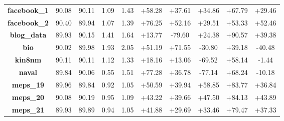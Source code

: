 \documentclass{article}
\begin{document}
\begin{table}[tbp]
{\begin{tabular}{cccccccccc}
    \textbf{facebook\_1} & 90.08  & 90.11  & 1.09  & 1.43  & \textcolor[rgb]{ 0,  .502,  0}{+58.28} & \textcolor[rgb]{ 0,  .502,  0}{+37.61} & \textcolor[rgb]{ 0,  .502,  0}{+34.86} & \textcolor[rgb]{ 0,  .502,  0}{+67.79} & \textcolor[rgb]{ 0,  .502,  0}{+29.46} \\
    \textbf{facebook\_2} & 90.40  & 89.94  & 1.07  & 1.39  & \textcolor[rgb]{ 0,  .502,  0}{+76.25} & \textcolor[rgb]{ 0,  .502,  0}{+52.16} & \textcolor[rgb]{ 0,  .502,  0}{+29.51} & \textcolor[rgb]{ 0,  .502,  0}{+53.33} & \textcolor[rgb]{ 0,  .502,  0}{+52.46} \\
    \textbf{blog\_data} & 89.93  & 90.15  & 1.41  & 1.64  & \textcolor[rgb]{ 0,  .502,  0}{+13.77} & \textcolor[rgb]{ 1,  0,  0}{-79.60} & \textcolor[rgb]{ 0,  .502,  0}{+24.38} & \textcolor[rgb]{ 0,  .502,  0}{+90.57} & \textcolor[rgb]{ 0,  .502,  0}{+39.38} \\
    \textbf{bio} & 90.02  & 89.98  & 1.93  & 2.05  & \textcolor[rgb]{ 0,  .502,  0}{+51.19} & \textcolor[rgb]{ 0,  .502,  0}{+71.55} & \textcolor[rgb]{ 1,  0,  0}{-30.80} & \textcolor[rgb]{ 0,  .502,  0}{+39.18} & \textcolor[rgb]{ 1,  0,  0}{-40.48} \\
    \textbf{kin8nm} & 90.11  & 90.11  & 1.12  & 1.33  & \textcolor[rgb]{ 0,  .502,  0}{+18.16} & \textcolor[rgb]{ 0,  .502,  0}{+13.06} & \textcolor[rgb]{ 1,  0,  0}{-69.52} & \textcolor[rgb]{ 0,  .502,  0}{+58.14} & \textcolor[rgb]{ 1,  0,  0}{-1.44} \\
    \textbf{naval} & 89.84  & 90.06  & 0.55  & 1.51  & \textcolor[rgb]{ 0,  .502,  0}{+77.28} & \textcolor[rgb]{ 0,  .502,  0}{+36.78} & \textcolor[rgb]{ 1,  0,  0}{-77.14} & \textcolor[rgb]{ 0,  .502,  0}{+68.24} & \textcolor[rgb]{ 1,  0,  0}{-10.18} \\
    \textbf{meps\_19} & 89.96  & 89.84  & 0.92  & 1.05  & \textcolor[rgb]{ 0,  .502,  0}{+50.59} & \textcolor[rgb]{ 0,  .502,  0}{+39.94} & \textcolor[rgb]{ 0,  .502,  0}{+58.85} & \textcolor[rgb]{ 0,  .502,  0}{+83.77} & \textcolor[rgb]{ 0,  .502,  0}{+36.84} \\
    \textbf{meps\_20} & 90.08  & 90.19  & 0.95  & 1.09  & \textcolor[rgb]{ 0,  .502,  0}{+43.22} & \textcolor[rgb]{ 0,  .502,  0}{+39.66} & \textcolor[rgb]{ 0,  .502,  0}{+47.50} & \textcolor[rgb]{ 0,  .502,  0}{+84.13} & \textcolor[rgb]{ 0,  .502,  0}{+43.89} \\
    \textbf{meps\_21} & 89.93  & 89.89  & 0.94  & 1.05  & \textcolor[rgb]{ 0,  .502,  0}{+41.88} & \textcolor[rgb]{ 0,  .502,  0}{+29.69} & \textcolor[rgb]{ 0,  .502,  0}{+33.46} & \textcolor[rgb]{ 0,  .502,  0}{+79.47} & \textcolor[rgb]{ 0,  .502,  0}{+37.33} \\
    
    
    \bottomrule[1.1pt]


    \end{tabular}%
    }
  \label{tab:real_cqr_results}%
\end{table}%
\end{document}
